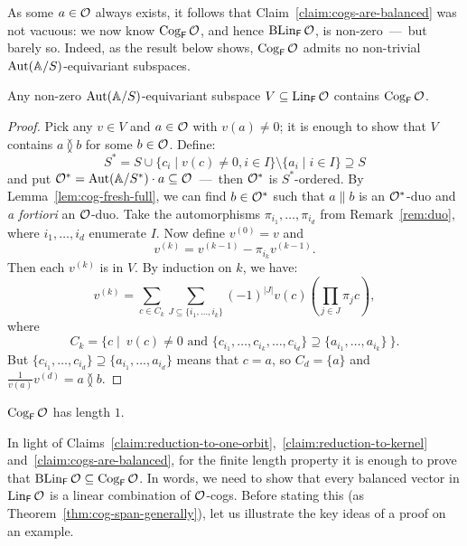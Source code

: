 As some $a \in \cal O$ always exists, it follows that Claim~\ref{claim:cogs-are-balanced} was not vacuous:
we now know $\Cog_\FF{\cal O}$, and hence $\Ker_\FF{\cal O}$, is non-zero~---~but barely so.
Indeed, as the result below shows, $\Cog_\FF{\cal O}$ admits no non-trivial $\Aut(\A/S)$-equivariant subspaces.
\begin{theorem} \label{thm:cogs-arise-everywhere}
    Any non-zero $\Aut(\A/S)$-equivariant subspace $V\subseteq \Lin_\FF \cal O$ contains $\Cog_\FF \cal O$.
\end{theorem}
\begin{proof}
    Pick any $v \in V$ and $a \in \cal O$ with $v(a)\neq 0$;
    it is enough to show that $V$ contains $a \between b$ for some $b\in \cal O$.
    Define:
    \[
        S^* = S \cup \{c_i \mid v(c) \neq 0, i \in I\} \setminus \{a_i \mid i \in I\} \supseteq S
    \]
    and put $\cal O^* = \Aut(\A / S^*) \cdot a \subseteq \cal O$~---~then $\cal O^*$ is $S^*$-ordered.
    By Lemma~\ref{lem:cog-fresh-full}, we can find $b \in \cal O^*$ such that $a \parallel b$ is an $\cal O^*$-duo and \emph{a fortiori} an $\cal O$-duo.
    Take the automorphisms $\pi_{i_1}, \dots, \pi_{i_d}$ from Remark~\ref{rem:duo}, where $i_1, \dots, i_d$ enumerate $I$.
    Now define $v^{(0)} = v$ and \[
        v^{(k)} = v^{(k-1)} - \pi_{i_k} v^{(k-1)}.
    \]
    Then each $v^{(k)}$ is in $V$.
   By induction on $k$, we have:
    \[
        v^{(k)} = \sum_{c \in C_k} \sum_{J \subseteq \{i_1, \dots, i_k\}} (-1)^{|J|} v(c) \left(\prod_{j \in J} \pi_j c\right),
    \]
    where
    \[C_k = \{ c \mid\ v(c) \neq 0 \text{ and } \{c_{i_1}, \dots, c_{i_k}, \dots, c_{i_d}\} \supseteq \{a_{i_1}, \dots, a_{i_k}\}\ \}.
    \]
    But $\{c_{i_1}, \dots, c_{i_d}\} \supseteq \{a_{i_1}, \dots, a_{i_d}\}$ means that $c = a$, so $C_d=\{a\}$ and $\frac{1}{v(a)}v^{(d)}=a\between b$.
\end{proof}

\begin{corollary}\label{cor:cog-simple}
    $\Cog_\FF \cal O$ has length $1$.
\end{corollary}

In light of Claims~\ref{claim:reduction-to-one-orbit},~\ref{claim:reduction-to-kernel} and~\ref{claim:cogs-are-balanced}, 
for the finite length property it is enough to prove that $\Ker_\FF \cal O \subseteq \Cog_\FF \cal O$. 
In words, we need to show that every balanced vector in $\Lin_\FF{\cal O}$ is a linear combination of $\cal O$-cogs.
Before stating this (as Theorem~\ref{thm:cog-span-generally}), let us illustrate the key ideas of a proof on an example.

